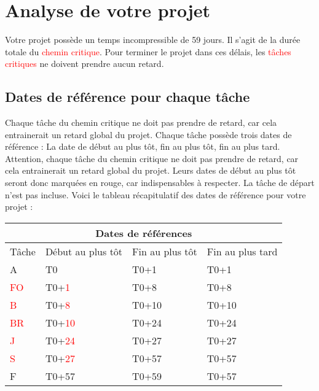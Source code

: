 \documentclass{article}
\begin{document}
\section{Analyse de votre projet}
Votre projet possède un temps incompressible de 59 jours.
    Il s'agit de la durée totale du \textcolor{red}{chemin critique}.
    Pour terminer le projet dans ces délais, les \textcolor{red}{tâches critiques} ne doivent prendre aucun retard.\subsection{Dates de référence pour chaque tâche}Chaque tâche du chemin critique ne doit pas prendre de
    retard, car cela entrainerait un retard global du projet. 
    Chaque tâche possède trois dates de référence : La date de début au plus tôt,
    fin au plus tôt, fin au plus tard.
    Attention, chaque tâche du chemin critique ne doit pas prendre de
    retard, car cela entrainerait un retard global du projet.
    Leurs dates de début au plus tôt seront donc marquées en rouge,
    car indispensables à respecter. La tâche de départ n'est pas incluse. \newpage
    Voici le tableau récapitulatif des dates de référence pour votre projet :\newline 
\begin{tabular}{ |p{3cm}||p{3cm}|p{3cm}|p{3cm}|  }
        \hline
        \multicolumn{4}{|c|}{Dates de références} \\
        \hline 
        Tâche&Début au plus tôt&Fin au plus tôt&Fin au plus tard \\ 
        \hline 
A&T0&T0+1&T0+1 \\ 
\textcolor{red}{FO}&T0+\textcolor{red}{1}&T0+8&T0+8 \\ 
\textcolor{red}{B}&T0+\textcolor{red}{8}&T0+10&T0+10 \\ 
\textcolor{red}{BR}&T0+\textcolor{red}{10}&T0+24&T0+24 \\ 
\textcolor{red}{J}&T0+\textcolor{red}{24}&T0+27&T0+27 \\ 
\textcolor{red}{S}&T0+\textcolor{red}{27}&T0+57&T0+57 \\ 
F&T0+57&T0+59&T0+57 \\ 
\hline
    \end{tabular} 
\end{document}
